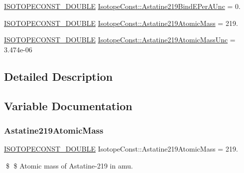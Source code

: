 \begin{DoxyCompactItemize}
\mbox{\hyperlink{group___isotope_const-_macros_ga8f45a7272ce02c0b4c65c44636ed719a}{I\+S\+O\+T\+O\+P\+E\+C\+O\+N\+S\+T\+\_\+\+D\+O\+U\+B\+LE}} \mbox{\hyperlink{group___isotope_const-_astatine-_at219_gaacf8567c2feab488a366a38b402cd7b8}{Isotope\+Const\+::\+Astatine219\+Bind\+E\+Per\+A\+Unc}} = 0.
\item 
\mbox{\hyperlink{group___isotope_const-_macros_ga8f45a7272ce02c0b4c65c44636ed719a}{I\+S\+O\+T\+O\+P\+E\+C\+O\+N\+S\+T\+\_\+\+D\+O\+U\+B\+LE}} \mbox{\hyperlink{group___isotope_const-_astatine-_at219_ga535702535856cf02947e81133e6a9554}{Isotope\+Const\+::\+Astatine219\+Atomic\+Mass}} = 219.
\item 
\mbox{\hyperlink{group___isotope_const-_macros_ga8f45a7272ce02c0b4c65c44636ed719a}{I\+S\+O\+T\+O\+P\+E\+C\+O\+N\+S\+T\+\_\+\+D\+O\+U\+B\+LE}} \mbox{\hyperlink{group___isotope_const-_astatine-_at219_ga2f42419116ea6b2272b1f99f9887d706}{Isotope\+Const\+::\+Astatine219\+Atomic\+Mass\+Unc}} = 3.\+474e-\/06
\end{DoxyCompactItemize}


\subsection{Detailed Description}


\subsection{Variable Documentation}
\mbox{\label{group___isotope_const-_astatine-_at219_ga535702535856cf02947e81133e6a9554}} 
\subsubsection{\texorpdfstring{Astatine219\+Atomic\+Mass}{Astatine219AtomicMass}}
{\footnotesize\ttfamily \mbox{\hyperlink{group___isotope_const-_macros_ga8f45a7272ce02c0b4c65c44636ed719a}{I\+S\+O\+T\+O\+P\+E\+C\+O\+N\+S\+T\+\_\+\+D\+O\+U\+B\+LE}} Isotope\+Const\+::\+Astatine219\+Atomic\+Mass = 219.}

\$ \$ Atomic mass of Astatine-\/219 in amu. \mbox{\label{group___isotope_const-_astatine-_at219_ga2f42419116ea6b2272b1f99f9887d706}} 
